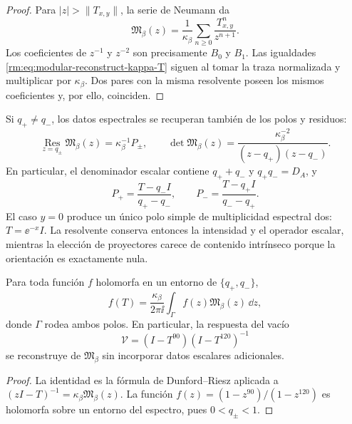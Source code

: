\begin{proof}
Para \(|z|>\lVert T_{x,y}\rVert\), la serie de Neumann da
\begin{equation}
 \mathfrak M_\beta(z)
 =\frac1{\kappa_\beta}
 \sum_{n\geq0}\frac{T_{x,y}^{n}}{z^{n+1}}.
 \label{rm:eq:modular-Laurent}
\end{equation}
Los coeficientes de \(z^{-1}\) y \(z^{-2}\) son precisamente \(B_0\) y
\(B_1\). Las igualdades \cref{rm:eq:modular-reconstruct-kappa-T} siguen al
tomar la traza normalizada y multiplicar por \(\kappa_\beta\). Dos pares con
la misma resolvente poseen los mismos coeficientes y, por ello, coinciden.
\end{proof}

Si \(q_+\ne q_-\), los datos espectrales se recuperan tambi\'en de los polos
y residuos:
\begin{equation}
 \operatorname*{Res}_{z=q_\pm}\mathfrak M_\beta(z)
 =\kappa_\beta^{-1}P_\pm,
 \qquad
 \det\mathfrak M_\beta(z)
 =\frac{\kappa_\beta^{-2}}
 {(z-q_+)(z-q_-)}.
 \label{rm:eq:modular-resolvent-residues}
\end{equation}
En particular, el denominador escalar contiene
\(q_++q_-\) y \(q_+q_-=D_A\), y
\begin{equation}
 P_+=\frac{T-q_-I}{q_+-q_-},
 \qquad
 P_-=\frac{T-q_+I}{q_--q_+}.
 \label{rm:eq:modular-projector-recovery}
\end{equation}
El caso \(y=0\) produce un \'unico polo simple de multiplicidad espectral
dos: \(T=\ee^{-x}I\). La resolvente conserva entonces la intensidad y el
operador escalar, mientras la elecci\'on de proyectores carece de contenido
intr\'inseco porque la orientaci\'on es exactamente nula.

\begin{corollary}
\label{rm:cor:modular-functional-calculus}
Para toda funci\'on \(f\) holomorfa en un entorno de
\(\{q_+,q_-\}\),
\begin{equation}
 f(T)=\frac{\kappa_\beta}{2\pi\ii}
 \int_\Gamma f(z)\mathfrak M_\beta(z)\,\dd z,
 \label{rm:eq:modular-Dunford}
\end{equation}
donde \(\Gamma\) rodea ambos polos. En particular, la respuesta del vac\'io
\[
 \mathcal V=(I-T^{90})(I-T^{120})^{-1}
\]
se reconstruye de \(\mathfrak M_\beta\) sin incorporar datos escalares
adicionales.
\end{corollary}

\begin{proof}
La identidad es la f\'ormula de Dunford--Riesz aplicada a
\((zI-T)^{-1}=\kappa_\beta\mathfrak M_\beta(z)\). La funci\'on
\(f(z)=(1-z^{90})/(1-z^{120})\) es holomorfa sobre un entorno del espectro,
pues \(0<q_\pm<1\).
\end{proof}

